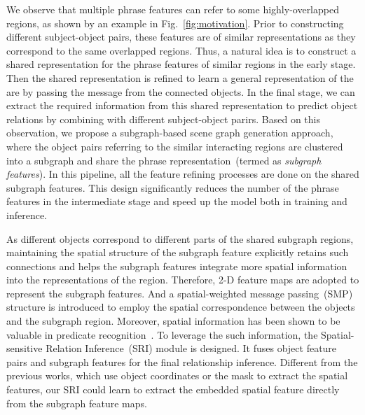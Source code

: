 \documentclass[runningheads]{llncs}
\begin{document}
 We observe that multiple phrase features can refer to some highly-overlapped regions, as shown by an example in  Fig.~\ref{fig:motivation}. Prior to constructing different subject-object pairs, these features are of similar representations as they correspond to the same overlapped regions. Thus, a natural idea is to construct a shared representation for the phrase features of similar regions in the early stage. Then the shared representation is refined to learn a general representation of the are by passing the message from the connected objects. In the final stage, we can extract the required information from this shared representation to predict object relations by combining with different subject-object parirs.  Based on this observation, we propose a subgraph-based scene graph generation approach, where the object pairs referring to the similar interacting regions are clustered into a subgraph and share the phrase representation~(termed as \emph{subgraph features}). In this pipeline, all the feature refining processes are done on the shared subgraph features. 
 This design significantly reduces the number of the phrase features in the intermediate stage and speed up the model both in training and inference. 

As different objects correspond to different parts of the shared subgraph regions, maintaining the spatial structure of the subgraph feature explicitly retains such connections and helps the subgraph features integrate more spatial information into the representations of the region. Therefore, 2-D feature maps are adopted to represent the subgraph features. And a spatial-weighted message passing~(SMP) structure is introduced to employ the spatial correspondence between the objects and the subgraph region. 
Moreover, spatial information has been shown to be valuable in predicate recognition~\cite{dai2017detecting,liao2017natural,yu2017visual}. To leverage the such information, the Spatial-sensitive Relation Inference~(SRI) module is designed. It fuses object feature pairs and subgraph features for the final relationship inference. 
Different from the previous works, which use object coordinates or the mask to extract the spatial features, our SRI could learn to extract the embedded spatial feature directly from the subgraph feature maps. 
\end{document}
